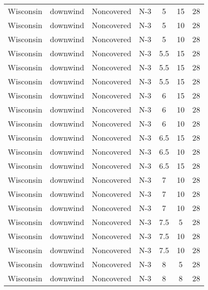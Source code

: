 \documentclass{article}
\begin{document}
\begin{longtable}[c]{ccccccc}
Wisconsin & downwind  & Noncovered & N-3             & 5            & 15          & 28  \\
Wisconsin & downwind  & Noncovered & N-3             & 5            & 10          & 28  \\
Wisconsin & downwind  & Noncovered & N-3             & 5            & 10          & 28  \\
Wisconsin & downwind  & Noncovered & N-3             & 5.5          & 15          & 28  \\
Wisconsin & downwind  & Noncovered & N-3             & 5.5          & 15          & 28  \\
Wisconsin & downwind  & Noncovered & N-3             & 5.5          & 15          & 28  \\
Wisconsin & downwind  & Noncovered & N-3             & 6            & 15          & 28  \\
Wisconsin & downwind  & Noncovered & N-3             & 6            & 10          & 28  \\
Wisconsin & downwind  & Noncovered & N-3             & 6            & 10          & 28  \\
Wisconsin & downwind  & Noncovered & N-3             & 6.5          & 15          & 28  \\
Wisconsin & downwind  & Noncovered & N-3             & 6.5          & 10          & 28  \\
Wisconsin & downwind  & Noncovered & N-3             & 6.5          & 15          & 28  \\
Wisconsin & downwind  & Noncovered & N-3             & 7            & 10          & 28  \\
Wisconsin & downwind  & Noncovered & N-3             & 7            & 10          & 28  \\
Wisconsin & downwind  & Noncovered & N-3             & 7            & 10          & 28  \\
Wisconsin & downwind  & Noncovered & N-3             & 7.5          & 5           & 28  \\
Wisconsin & downwind  & Noncovered & N-3             & 7.5          & 10          & 28  \\
Wisconsin & downwind  & Noncovered & N-3             & 7.5          & 10          & 28  \\
Wisconsin & downwind  & Noncovered & N-3             & 8            & 5           & 28  \\
Wisconsin & downwind  & Noncovered & N-3             & 8            & 8           & 28  \\

\end{longtable}
\end{document}
